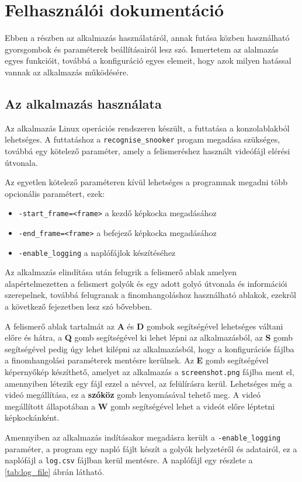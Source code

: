 \chapter{Felhasználói dokumentáció}
Ebben a részben az alkalmazás használatáról, annak futása közben használható gyorsgombok és paraméterek beállításairól lesz szó. Ismertetem az alalmazás egyes funkcióit, továbbá a konfiguráció egyes elemeit, hogy azok milyen hatással vannak az alkalmazás működésére.

\section{Az alkalmazás használata}
Az alkalmazás Linux operációs rendszeren készült, a futtatása a konzolablakból lehetséges. A futtatáshoz a \lstinline{recognise_snooker} progam megadása szükséges, továbbá egy kötelező paraméter, amely a felismeréshez használt videófájl elérési útvonala.
\par Az egyetlen kötelező paraméteren kívül lehetséges a programnak megadni több opcionális paramétert, ezek:

\begin{itemize}
    \setlength\itemsep{-2pt}
    \item \lstinline{-start_frame=<frame>} a kezdő képkocka megadásához
    \item \lstinline{-end_frame=<frame>} a befejező képkocka megadásához
    \item \lstinline{-enable_logging} a naplófájlok készítéséhez
\end{itemize}

\par Az alkalmazás elindítása után felugrik a felismerő ablak amelyen alapértelmezetten a felismert golyók és egy adott golyó útvonala és információi szerepelnek, továbbá felugranak a finomhangoláshoz használható ablakok, ezekről a következő fejezetben lesz szó bővebben.
\par A felismerő ablak tartalmát az \textbf{A} és \textbf{D} gombok segítségével lehetséges váltani előre és hátra, a \textbf{Q} gomb segítségével ki lehet lépni az alkalmazásból, az \textbf{S} gomb segítségével pedig úgy lehet kilépni az alkalmazásból, hogy a konfigurációs fájlba a finomhangolási paraméterek mentésre kerülnek. Az \textbf{E} gomb segítségével képernyőkép készíthető, amelyet az alkalmazás a \lstinline{screenshot.png} fájlba ment el, amennyiben létezik egy fájl ezzel a névvel, az felülírásra kerül. Lehetséges még a videó megállítása, ez a \textbf{szóköz} gomb lenyomásával tehető meg. A videó megállított állapotában a \textbf{W} gomb segítségével lehet a videót előre léptetni képkockánként.
\par Amennyiben az alkalmazás indításakor megadásra került a \lstinline{-enable_logging} paraméter, a program egy napló fájlt készít a golyók helyzetéről és adatairól, ez a naplófájl a \lstinline{log.csv} fájlban kerül mentésre. A naplófájl egy részlete a \ref{tab:log_file} ábrán látható.


